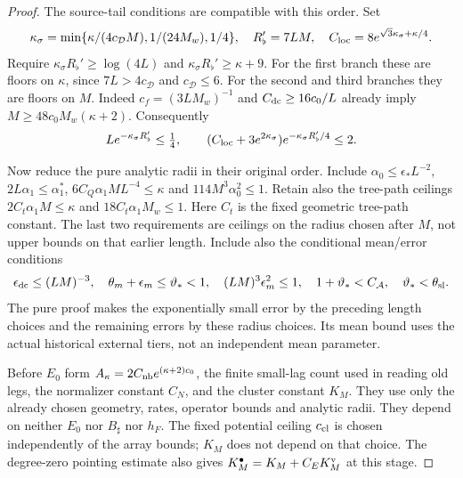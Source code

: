 \documentclass[11pt,letterpaper,reqno]{amsart}
\theoremstyle{definition}
\theoremstyle{remark}
\begin{document}
\begin{proof}
The source-tail conditions are compatible with this order.
Set
\[
 \kappa_\sigma=\min\{\kappa/(4c_{\mathcal D}M),
                   1/(24M_w),1/4\},\quad R_\flat'=7LM,
 \quad C_{\rm loc}=8e^{\sqrt3\kappa_\sigma+\kappa/4}.
\]
Require $\kappa_\sigma R_\flat'\ge\log(4L)$ and
$\kappa_\sigma R_\flat'\ge\kappa+9$.
For the first branch these are floors on $\kappa$, since
$7L>4c_{\mathcal D}$ and $c_{\mathcal D}\le6$.
For the second and third branches they are floors on $M$.
Indeed $c_f=(3LM_w)^{-1}$ and $C_{\rm dc}\ge16c_0/L$
already imply $M\ge48c_0M_w(\kappa+2)$.
Consequently
\[
 Le^{-\kappa_\sigma R_\flat'}\le\tfrac14,
 \qquad
 (C_{\rm loc}+3e^{2\kappa_\sigma})
                   e^{-\kappa_\sigma R_\flat'/4}\le2.
\]

Now reduce the pure analytic radii in their original order.
Include $\alpha_0\le\epsilon_*L^{-2}$,
$2L\alpha_1\le\alpha_1^*$,
$6C_Q\alpha_1ML^{-4}\le\kappa$ and $114M^3\alpha_0^2\le1$.
Retain also the tree-path ceilings
$2C_t\alpha_1M\le\kappa$ and $18C_t\alpha_1M_w\le1$.
Here $C_t$ is the fixed geometric tree-path constant. The
last two requirements are ceilings on the radius chosen
after $M$, not upper bounds on that earlier length.
Include also the conditional mean/error
conditions
\[
 \epsilon_{\rm dc}\le(LM)^{-3},\quad
 \theta_m+\epsilon_m\le\vartheta_*<1,\quad
 (LM)^3\epsilon_m^2\le1,\quad
 1+\vartheta_*<C_{\mathcal A},\quad
 \vartheta_*<\theta_{\rm sl}.
\]
The pure proof makes the exponentially small error by the
preceding length choices and the remaining errors by these
radius choices. Its mean bound uses the actual historical
external tiers, not an independent mean parameter.

Before $E_0$ form $A_\kappa=2C_{\rm nb}e^{(\kappa+2)c_0}$,
the finite small-lag count used in reading old legs, the
normalizer constant $C_N$, and the cluster constant $K_M$.
They use only the already chosen geometry, rates, operator
bounds and analytic radii. They depend on neither $E_0$ nor
$B_\sharp$ nor $h_F$. The fixed potential ceiling
$c_{\rm cl}$ is chosen independently of the array bounds;
$K_M$ does not depend on that choice.
The degree-zero pointing estimate also gives
$K_M^\bullet=K_M+C_EK_M^{\rm v}$ at this stage.


\end{proof}
\end{document}
